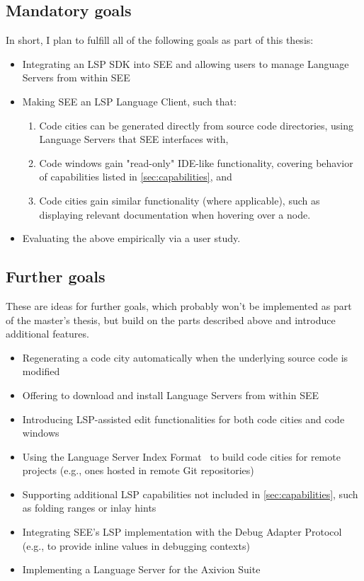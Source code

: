 \documentclass{scrartcl}
\newcommand{\SEE}{\textsc{SEE}}
\begin{document}
{\subsection{Mandatory goals}
In short, I plan to fulfill all of the following goals as part of this thesis:
\begin{itemize}
  \item Integrating an LSP SDK into \SEE{} and allowing users to manage Language Servers from within SEE
  \item Making \SEE{} an LSP Language Client, such that:
    \begin{enumerate}
      \item Code cities can be generated directly from source code directories, using Language Servers that \SEE{} interfaces with,
      \item Code windows gain "read-only" IDE-like functionality, covering behavior of capabilities listed in \autoref{sec:capabilities}, and
      \item Code cities gain similar functionality (where applicable), such as displaying relevant documentation when hovering over a node.
    \end{enumerate}
  \item Evaluating the above empirically via a user study.
\end{itemize}

\subsection{Further goals}
These are ideas for further goals, which probably won't be implemented as part of the master's thesis, but build on the parts described above and introduce additional features.
\begin{itemize}
  \item Regenerating a code city automatically when the underlying source code is modified
  \item Offering to download and install Language Servers from within \SEE{}
  \item Introducing LSP-assisted edit functionalities for both code cities and code windows
  \item Using the Language Server Index Format~\cite{lsif} to build code cities for remote projects (e.g., ones hosted in remote Git repositories)
  \item Supporting additional LSP capabilities not included in \autoref{sec:capabilities}, such as folding ranges or inlay hints
  \item Integrating \SEE{}'s LSP implementation with the Debug Adapter Protocol~\cite{dap} (e.g., to provide inline values in debugging contexts)
  \item Implementing a Language Server for the Axivion Suite
\end{itemize}

}
\end{document}
